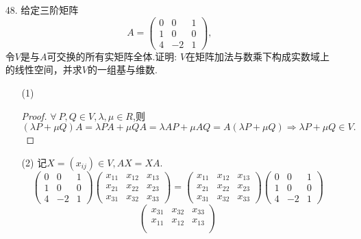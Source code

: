 \documentclass{article}
\begin{document}
\begin{enumerate}
\begin{proof}
        综上即证.
    \end{proof}
    \item [48.]给定三阶矩阵
    \[
        A=\begin{pmatrix}
            0 & 0 & 1\\
            1 & 0 & 0\\
            4 & -2 & 1
        \end{pmatrix},
    \]
    令$V$是与$A$可交换的所有实矩阵全体.证明: $V$在矩阵加法与数乘下构成实数域上的线性空间，并求$V$的一组基与维数.
    \begin{enumerate}
        \item [(1)]
        \begin{proof}$\forall\ P,Q\in V,\lambda,\mu \in R$,则
            \[
                (\lambda P+\mu Q)A=\lambda PA+\mu QA=\lambda AP+\mu AQ=A(\lambda P+\mu Q)
                \Rightarrow
                \lambda P+\mu Q \in V.
            \]
        \end{proof}
        \item [(2)]记$X=(x_{ij})\in V,AX=XA$.
        \[
            \begin{pmatrix}
                0 & 0 & 1\\
                1 & 0 & 0\\
                4 & -2 & 1
            \end{pmatrix}
            \begin{pmatrix}
                x_{11} & x_{12} & x_{13}\\
                x_{21} & x_{22} & x_{23}\\
                x_{31} & x_{32} & x_{33}
            \end{pmatrix}
            =
            \begin{pmatrix}
                x_{11} & x_{12} & x_{13}\\
                x_{21} & x_{22} & x_{23}\\
                x_{31} & x_{32} & x_{33}
            \end{pmatrix}
            \begin{pmatrix}
                0 & 0 & 1\\
                1 & 0 & 0\\
                4 & -2 & 1
            \end{pmatrix}
        \]
        \[
            \begin{pmatrix}
                x_{31} & x_{32} & x_{33}\\
                x_{11} & x_{12} & x_{13}\\

\end{pmatrix}\]
\end{enumerate}
\end{enumerate}
\end{document}

